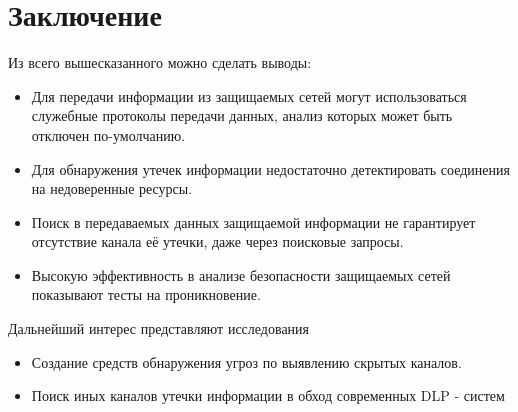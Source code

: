 \chapter*{Заключение}

Из всего вышесказанного можно сделать выводы:

\begin{itemize}
	\item
		Для передачи информации из защищаемых сетей могут использоваться служебные протоколы передачи данных, анализ которых может быть отключен по-умолчанию.
	\item
		Для обнаружения утечек информации недостаточно детектировать соединения на недоверенные ресурсы.
	\item
		Поиск в передаваемых данных защищаемой информации не гарантирует отсутствие канала её утечки, даже через поисковые запросы.
	\item
		Высокую эффективность в анализе безопасности защищаемых сетей показывают тесты на проникновение.
\end{itemize}

Дальнейший интерес представляют исследования

\begin{itemize}
    \item
        Создание средств обнаружения угроз по выявлению скрытых каналов.

    \item
        Поиск иных каналов утечки информации в обход современных DLP - систем

\end{itemize}
